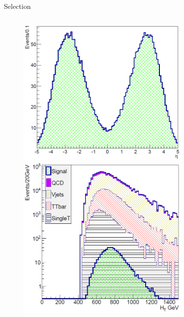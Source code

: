 \begin{frame}{Selection}
\begin{columns}
\begin{column}{.50\textwidth}
\begin{figure}[!Hhtbp]
  \begin{center}
    \includegraphics[width=0.75\textwidth]{../figs/Pheno/SixthJet.png}\\
    \includegraphics[width=0.75\textwidth]{../figs/Pheno/HT.png}
  \end{center}
\end{figure}
\end{column}
\end{columns}

\end{frame}

